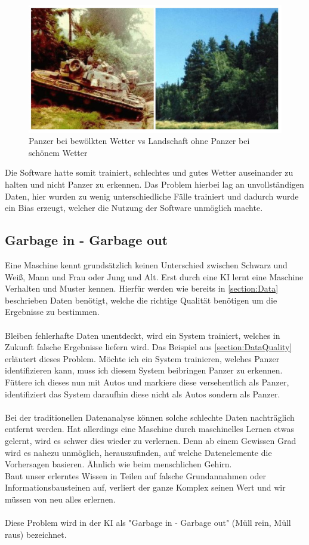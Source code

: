 \documentclass[12pt,oneside,a4paper,parskip]{scrbook}
\begin{document}
\begin{figure}[h]
	\begin{center}
		\includegraphics[width=15cm]{Bilder/tank.png}
		\caption{Panzer bei bewölkten Wetter vs Landschaft ohne Panzer bei schönem Wetter}
		\label{fig:tank}
	\end{center}
\end{figure}
Die Software hatte somit trainiert, schlechtes und gutes Wetter auseinander zu halten und nicht Panzer zu erkennen. Das Problem hierbei lag an unvollständigen Daten, hier wurden zu wenig unterschiedliche Fälle trainiert und dadurch wurde ein Bias erzeugt, welcher die Nutzung der Software unmöglich machte.

\subsection{Garbage in - Garbage out}
\label{section:DataGarbage}
Eine Maschine kennt grundsätzlich keinen Unterschied zwischen Schwarz und Weiß, Mann und Frau oder Jung und Alt. Erst durch eine KI lernt eine Maschine Verhalten und Muster kennen. Hierfür werden wie bereits in \ref{section:Data} beschrieben Daten benötigt, welche die richtige Qualität benötigen um die Ergebnisse zu bestimmen.
\\\\
Bleiben fehlerhafte Daten unentdeckt, wird ein System trainiert, welches in Zukunft falsche Ergebnisse liefern wird. Das Beispiel aus \ref{section:DataQuality} erläutert dieses Problem. Möchte ich ein System trainieren, welches Panzer identifizieren kann, muss ich diesem System beibringen Panzer zu erkennen. Füttere ich dieses nun mit Autos und markiere diese versehentlich als Panzer, identifiziert das System daraufhin diese nicht als Autos sondern als Panzer.
\\\\
Bei der traditionellen  Datenanalyse können solche schlechte Daten nachträglich entfernt werden. Hat allerdings eine Maschine durch maschinelles Lernen etwas gelernt, wird es schwer dies wieder zu verlernen. Denn ab einem Gewissen Grad wird es nahezu unmöglich, herauszufinden, auf welche Datenelemente die Vorhersagen basieren. Ähnlich wie beim menschlichen Gehirn.\\
Baut unser erlerntes Wissen in Teilen auf falsche Grundannahmen oder Informationsbausteinen auf, verliert der ganze Komplex seinen Wert und wir müssen von neu alles erlernen.
\\\\
Diese Problem wird in der KI als "Garbage in - Garbage out" (Müll rein, Müll raus) bezeichnet.
\end{document}
